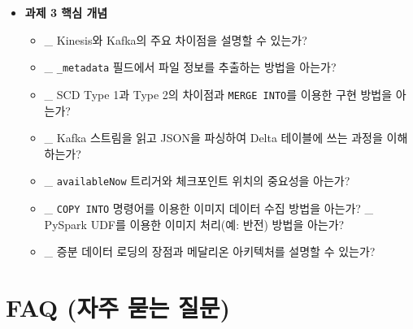 \documentclass[11pt,a4paper]{article}
\theoremstyle{definition}
\begin{document}
\begin{itemize}
\begin{itemize}
        \item \_ 노트북 위젯을 이용한 쿼리 파라미터화 방법을 아는가?
        \item \_ 스트리밍의 내결함성(체크포인팅, 아이뎀포턴트 싱크)을 이해하는가?
        \item \_ 브로드캐스트 변수의 특징(불변성, 로컬 복사)을 아는가?
        \item \_ \texttt{repartition()}과 \texttt{coalesce()}의 차이점을 아는가?
        \item \_ \texttt{explode()} 함수를 이용한 배열 컬럼 처리 방법을 아는가?
        \item \_ \texttt{take()}와 \texttt{collect()}의 차이점과 주의사항을 아는가?
        \item \_ MLflow 모델 레지스트리 및 \texttt{autolog}의 목적을 아는가?
        \item \_ 하이퍼파라미터 최적화(Optuna) 및 차원 축소(PCA) 개념을 아는가?
        \item \_ 불균형 데이터셋 처리 기법(오버/언더샘플링, SMOTE)을 아는가?
    \end{itemize}
    \item \textbf{과제 3 핵심 개념}
    \begin{itemize}
        \item \_ Kinesis와 Kafka의 주요 차이점을 설명할 수 있는가?
        \item \_ \texttt{_metadata} 필드에서 파일 정보를 추출하는 방법을 아는가?
        \item \_ SCD Type 1과 Type 2의 차이점과 \texttt{MERGE INTO}를 이용한 구현 방법을 아는가?
        \item \_ Kafka 스트림을 읽고 JSON을 파싱하여 Delta 테이블에 쓰는 과정을 이해하는가?
        \item \_ \texttt{availableNow} 트리거와 체크포인트 위치의 중요성을 아는가?
        \item \_ \texttt{COPY INTO} 명령어를 이용한 이미지 데이터 수집 방법을 아는가?
        \_ PySpark UDF를 이용한 이미지 처리(예: 반전) 방법을 아는가?
        \item \_ 증분 데이터 로딩의 장점과 메달리온 아키텍처를 설명할 수 있는가?
    \end{itemize}
\end{itemize}

\newpage
\section*{FAQ (자주 묻는 질문)}
\end{document}
